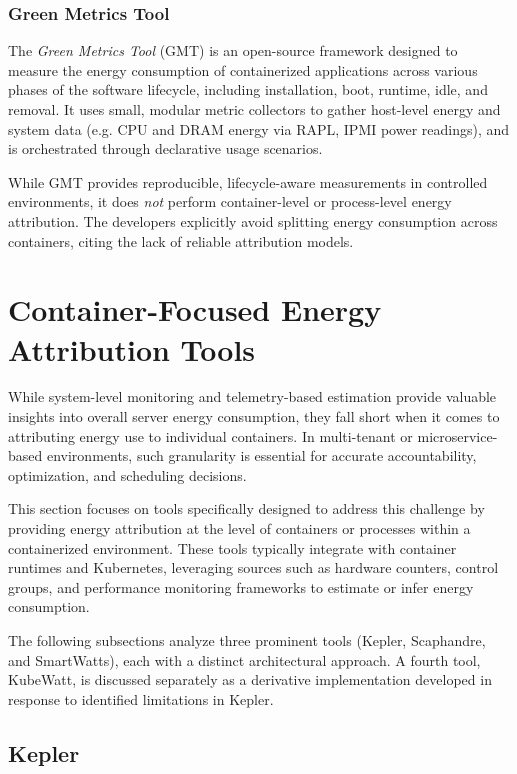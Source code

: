 \subsubsection{Green Metrics Tool}

The \textit{Green Metrics Tool} (GMT)\parencite{greencodingdocs} is an open-source framework designed to measure the energy consumption of containerized applications across various phases of the software lifecycle, including installation, boot, runtime, idle, and removal. It uses small, modular metric collectors to gather host-level energy and system data (e.g. CPU and DRAM energy via RAPL, IPMI power readings), and is orchestrated through declarative usage scenarios.

While GMT provides reproducible, lifecycle-aware measurements in controlled environments, it does \textit{not} perform container-level or process-level energy attribution. The developers explicitly avoid splitting energy consumption across containers, citing the lack of reliable attribution models.

\section{Container-Focused Energy Attribution Tools}
\label{sec:container-tools}

While system-level monitoring and telemetry-based estimation provide valuable insights into overall server energy consumption, they fall short when it comes to attributing energy use to individual containers. In multi-tenant or microservice-based environments, such granularity is essential for accurate accountability, optimization, and scheduling decisions.

This section focuses on tools specifically designed to address this challenge by providing energy attribution at the level of containers or processes within a containerized environment. These tools typically integrate with container runtimes and Kubernetes, leveraging sources such as hardware counters, control groups, and performance monitoring frameworks to estimate or infer energy consumption.

The following subsections analyze three prominent tools (Kepler, Scaphandre, and SmartWatts), each with a distinct architectural approach. A fourth tool, KubeWatt, is discussed separately as a derivative implementation developed in response to identified limitations in Kepler.

\subsection{Kepler}
\label{sec:kepler}

